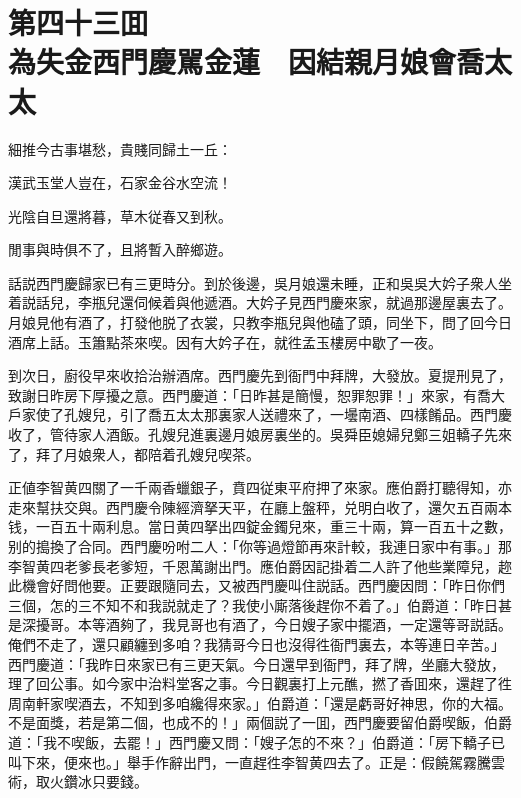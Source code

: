 
\chapter*{第四十三囬　\\為失金西門慶駡金蓮　因結親月娘會喬太太}


\begin{myquote}
細推今古事堪愁，貴賤同歸土一丘：

漢武玉堂人豈在，石家金谷水空流！

光陰自旦還將暮，草木従春又到秋。

閒事與時俱不了，且將暫入醉鄉遊。
\end{myquote}

話説西門慶歸家已有三更時分。到於後邊，吳月娘還未睡，正和吳吳大妗子衆人坐着説話兒，李瓶兒還伺候着與他遞酒。大妗子見西門慶來家，就過那邊屋裏去了。月娘見他有酒了，打發他脱了衣裳，只教李瓶兒與他磕了頭，同坐下，問了回今日酒席上話。玉簫點茶來喫。因有大妗子在，就徃孟玉樓房中歇了一夜。

到次日，廚役早來收拾治辦酒席。西門慶先到衙門中拜牌，大發放。夏提刑見了，致謝日昨房下厚擾之意。西門慶道：「日昨甚是簡慢，恕罪恕罪！」來家，有喬大戶家使了孔嫂兒，引了喬五太太那裏家人送禮來了，一壜南酒、四樣餚品。西門慶收了，管待家人酒飯。孔嫂兒進裏邊月娘房裏坐的。吳舜臣媳婦兒鄭三姐轎子先來了，拜了月娘衆人，都陪着孔嫂兒喫茶。

正値李智黄四關了一千兩香蠟銀子，賁四従東平府押了來家。應伯爵打聽得知，亦走來幫扶交與。西門慶令陳經濟拏天平，在廳上盤秤，兑明白收了，還欠五百兩本钱，一百五十兩利息。當日黄四拏出四錠金鐲兒來，重三十兩，算一百五十之數，别的搗換了合同。西門慶吩咐二人：「你等過燈節再來計較，我連日家中有事。」那李智黄四老爹長老爹短，千恩萬謝出門。應伯爵因記掛着二人許了他些業障兒，趂此機會好問他要。正要跟隨同去，又被西門慶叫住説話。西門慶因問：「昨日你們三個，怎的三不知不和我説就走了？我使小廝落後趕你不着了。」伯爵道：「昨日甚是深擾哥。本等酒夠了，我見哥也有酒了，今日嫂子家中擺酒，一定還等哥説話。俺們不走了，還只顧纏到多咱？我猜哥今日也沒得徃衙門裏去，本等連日辛苦。」西門慶道：「我昨日來家已有三更天氣。今日還早到衙門，拜了牌，坐廳大發放，理了回公事。如今家中治料堂客之事。今日觀裏打上元醮，撚了香囬來，還趕了徃周南軒家喫酒去，不知到多咱纔得來家。」伯爵道：「還是虧哥好神思，你的大福。不是面獎，若是第二個，也成不的！」兩個説了一囬，西門慶要留伯爵喫飯，伯爵道：「我不喫飯，去罷！」西門慶又問：「嫂子怎的不來？」伯爵道：「房下轎子已叫下來，便來也。」舉手作辭出門，一直趕徃李智黄四去了。正是：假饒駕霧騰雲術，取火鑽冰只要錢。

